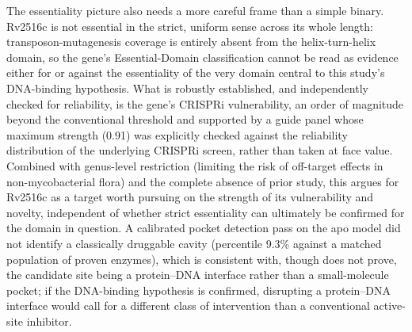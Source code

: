 \documentclass[11pt,a4paper]{article}
\begin{document}
The essentiality picture also needs a more careful frame than a simple binary. Rv2516c is not
essential in the strict, uniform sense across its whole length: transposon-mutagenesis coverage is
entirely absent from the helix-turn-helix domain, so the gene's Essential-Domain classification
cannot be read as evidence either for or against the essentiality of the very domain central to
this study's DNA-binding hypothesis. What is robustly established, and independently checked for
reliability, is the gene's CRISPRi vulnerability, an order of magnitude beyond the conventional
threshold and supported by a guide panel whose maximum strength (0.91) was explicitly checked
against the reliability distribution of the underlying CRISPRi screen, rather than taken at face
value. Combined with genus-level restriction (limiting the risk of off-target effects in
non-mycobacterial flora) and the complete absence of prior study, this argues for Rv2516c as a
target worth pursuing on the strength of its vulnerability and novelty, independent of whether
strict essentiality can ultimately be confirmed for the domain in question. A calibrated pocket
detection pass on the apo model did not identify a classically druggable cavity (percentile 9.3\%
against a matched population of proven enzymes), which is consistent with, though does not prove,
the candidate site being a protein--DNA interface rather than a small-molecule pocket; if the
DNA-binding hypothesis is confirmed, disrupting a protein--DNA interface would call for a different
class of intervention than a conventional active-site inhibitor.
\end{document}
